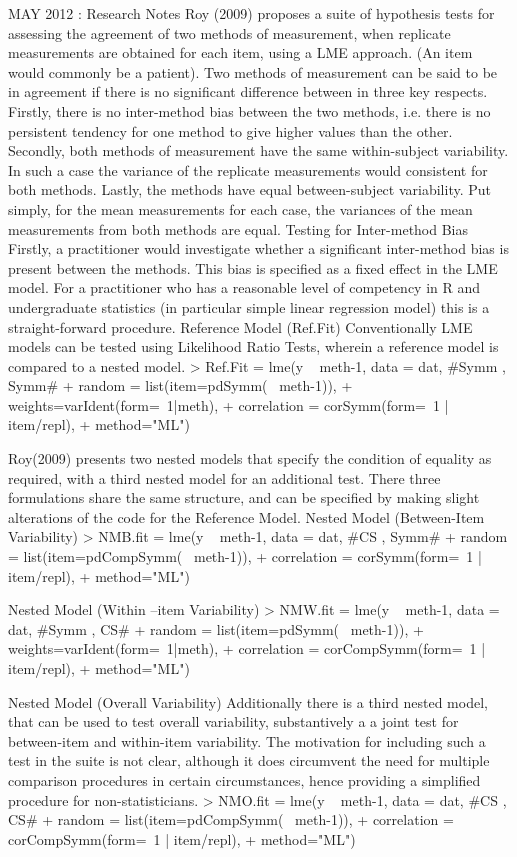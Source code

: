 
MAY 2012 : Research Notes
Roy (2009) proposes a suite of hypothesis tests for assessing the agreement of two methods of measurement, when replicate measurements are obtained for each item, using a LME approach. (An item would commonly be a patient).  Two methods of measurement can be said to be in agreement if there is no significant difference between in three key respects. Firstly, there is no inter-method bias between the two methods, i.e. there is no persistent tendency for one method to give higher values than the other.
Secondly, both methods of measurement have the same  within-subject variability. In such a case the variance of the replicate measurements would consistent for both methods.
Lastly, the methods have equal between-subject variability.  Put simply, for the mean measurements for each case, the variances of the mean measurements from both methods are equal.
Testing for Inter-method Bias
Firstly, a practitioner would investigate whether a significant inter-method bias is present between the methods. This bias is specified as a fixed effect in the LME model.  For a practitioner who has a reasonable level of competency in R and undergraduate statistics (in particular simple linear regression model) this is a straight-forward procedure.
Reference Model (Ref.Fit)
Conventionally LME models can be tested using Likelihood Ratio Tests, wherein a reference model is compared to a nested model.
> Ref.Fit = lme(y ~ meth-1, data = dat,   #Symm , Symm#
+     random = list(item=pdSymm(~ meth-1)), 
+     weights=varIdent(form=~1|meth),
+     correlation = corSymm(form=~1 | item/repl), 
+     method="ML")

Roy(2009) presents two nested models that specify the condition of equality as required, with a third nested model for an additional test. There three formulations share the same structure, and can be specified by making slight alterations of the code for the Reference Model.
Nested Model (Between-Item Variability)
> NMB.fit  = lme(y ~ meth-1, data = dat,   #CS , Symm#
+     random = list(item=pdCompSymm(~ meth-1)),
+     correlation = corSymm(form=~1 | item/repl), 
+     method="ML")


Nested Model (Within –item Variability)
> NMW.fit = lme(y ~ meth-1, data = dat,   #Symm , CS# 
+     random = list(item=pdSymm(~ meth-1)),
+     weights=varIdent(form=~1|meth), 
+     correlation = corCompSymm(form=~1 | item/repl), 
+     method="ML")




Nested Model (Overall Variability)
Additionally there is a third nested model, that can be used to test overall variability, substantively a a joint test for between-item and within-item variability. The motivation for including such a test in the suite is not clear, although it does circumvent the need for multiple comparison procedures in certain circumstances, hence providing a simplified procedure for non-statisticians.
   > NMO.fit = lme(y ~ meth-1, data = dat,   #CS , CS# 
+     random = list(item=pdCompSymm(~ meth-1)), 
+     correlation = corCompSymm(form=~1 | item/repl), 
+     method="ML")


